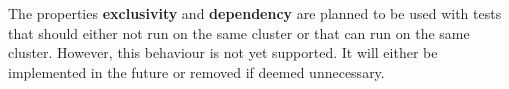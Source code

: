 The properties \textbf{exclusivity} and \textbf{dependency} are planned to be used with tests that should either not run on the same cluster or that can run on the same cluster.
However, this behaviour is not yet supported.
It will either be implemented in the future or removed if deemed unnecessary.
